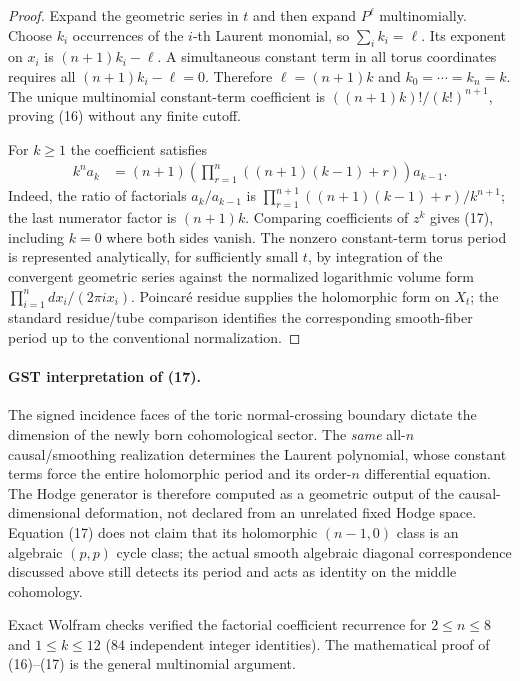 \documentclass[11pt]{article}
\begin{document}
\begin{proof}
Expand the geometric series in $t$ and then expand
$P^\ell$ multinomially. Choose $k_i$ occurrences of the
$i$-th Laurent monomial, so $\sum_i k_i=\ell$.
Its exponent on $x_i$ is $(n+1)k_i-\ell$. A
simultaneous constant term in all torus coordinates
requires all $(n+1)k_i-\ell=0$.
Therefore $\ell=(n+1)k$ and
$k_0=\cdots=k_n=k$.  The unique multinomial
constant-term coefficient is
$((n+1)k)!/(k!)^{n+1}$, proving (16) without any
finite cutoff.

For $k\ge1$ the coefficient satisfies
\[
\begin{split}
k^n a_k
&=(n+1)\left(\prod_{r=1}^{n}
 ((n+1)(k-1)+r)\right)a_{k-1}.
\end{split}
\]
Indeed, the ratio of factorials
$a_k/a_{k-1}$ is
$\prod_{r=1}^{n+1}((n+1)(k-1)+r)/k^{n+1}$;
the last numerator factor is $(n+1)k$.
Comparing coefficients of $z^k$ gives (17),
including $k=0$ where both sides vanish.
The nonzero constant-term torus period is represented
analytically, for sufficiently small $t$, by integration
of the convergent geometric series against the
normalized logarithmic volume form
$\prod_{i=1}^{n} dx_i/(2\pi i x_i)$.
Poincar\'e residue supplies the holomorphic form
on $X_t$; the standard residue/tube comparison
identifies the corresponding smooth-fiber period
up to the conventional normalization.
\end{proof}

\paragraph{GST interpretation of (17).}
The signed incidence faces of the toric normal-crossing
boundary dictate the dimension of the newly born
cohomological sector.  The \emph{same} all-$n$
causal/smoothing realization determines the Laurent
polynomial, whose constant terms force the entire
holomorphic period and its order-$n$ differential
equation. The Hodge generator is therefore computed as
a geometric output of the causal-dimensional deformation,
not declared from an unrelated fixed Hodge space.
Equation (17) does not claim that its holomorphic
$(n-1,0)$ class is an algebraic $(p,p)$ cycle class;
the actual smooth algebraic diagonal correspondence
discussed above still detects its period and acts
as identity on the middle cohomology.

Exact Wolfram checks verified the factorial coefficient
recurrence for $2\le n\le8$ and $1\le k\le12$
($84$ independent integer identities). The mathematical
proof of (16)--(17) is the general multinomial argument.
\end{document}
